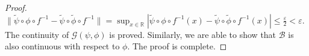 \documentclass[10pt,a4paper]{amsart}
\renewcommand{\epsilon}{\varepsilon}
\begin{document}
\begin{proof}
$\|\tilde \psi \circ \phi \circ f^{-1}-\tilde \psi \circ \tilde{\phi} \circ f^{-1}\| =\sup_{x \in \mathbb{R}}|\tilde\psi \circ \phi \circ f^{-1}(x)-\tilde\psi \circ \tilde{\phi} \circ f^{-1}(x)| \le \frac{\epsilon}{2} < \epsilon.$
The continuity of $\mathcal{G} (\psi,\phi)$ is proved. 
Similarly, we are able to show that $\mathcal{B}$ is also continuous with respect to $\phi$. The proof is complete.
\end{proof}
\end{document}
